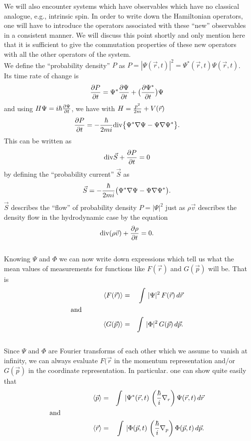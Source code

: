  We will also encounter systems which have observables which have no classical analogue, e.g., intrinsic spin. In order to write down
 the Hamiltonian operators, one will have to introduce the operators associated with these ``new'' observables in a consistent manner. We will discuss
 this point shortly and only mention here that it is sufficient to give the commutation properties of these new operators with all the other operators
 of the system.\\
 
 We define the ``probability density'' $P$ as $P = |\Psi(\vec{r},t)|^2 = \Psi^*(\vec{r},t) \Psi(\vec{r},t)$. Its time rate of change is 
 $${\partial P\over \partial t} = \Psi^*{\partial \Psi\over \partial t} + \big( {\partial \Psi^*\over \partial t} \big)\Psi$$and using 
 $H\Psi = i\hbar {\partial \Psi\over \partial t}$,  we have with $H = {p^2\over 2m} + V(\vec{r})$
 $${\partial P\over \partial t} = -{\hbar\over2m i} \hbox{div}\big\{\Psi^*\nabla \Psi - \Psi \nabla\Psi^* \big\}.$$This can be written as
 $$\hbox{div}\vec{S} + {\partial P\over \partial t} = 0$$by defining the ``probability current'' $\vec{S}$ as
 $$\vec{S} = -{\hbar\over2m i} \big(\Psi^*\nabla \Psi - \Psi \nabla\Psi^* \big).$$$\vec{S}$ describes the ``flow'' of probability density $P=|\Psi|^2$ just as
 $\rho \vec{v}$ describes the density flow in the hydrodynamic case by the equation
 $$\hbox{div}(\rho\vec{v}) + {\partial \rho\over \partial t} = 0.$$\\
  Knowing $\Psi$ and $\Phi$ we can now write down expressions which tell us what the mean values of measurements for functions like
 $F(\vec{r})$ and $G(\vec{p})$ will be. That is 
 \begin{eqnarray*}
  \langle F(\vec{r})\rangle  &=& \int  \, |\Psi|^2\, F(\vec{r})\,d\vec{r} \\ 
  \hbox{and~~~~~~~~~~~~~~~~~~\hfill} &\null&\\
  \langle G(\vec{p})\rangle  &=& \int  \, |\Phi|^2\, G(\vec{p})\,d\vec{p}.
 \end{eqnarray*}\\
 
 Since $\Psi$ and $\Phi$ are Fourier transforms of each other which we assume to vanish at infinity, we can always evaluate $F(\vec{r}$ in the momentum representation and/or $G(\vec{p})$ in the coordinate representation. In particular. one can show quite easily that 
  \begin{eqnarray*}
  \langle \vec{p}\rangle  &=& \int  \, |\Psi^*(\vec{r},t)\, \left( {\hbar\over i} \nabla_r\right) \Psi(\vec{r},t)\,d\vec{r}\\
  \hbox{and~~~~~~~~~~~~~~~~~~\hfill} &\null&\\
  \langle \vec{r}\rangle  &=& \int  \, |\Phi(\vec{p},t)\, \left( {\hbar\over i} \nabla_p\right) \Phi(\vec{p},t)\,d\vec{p}. 
 \end{eqnarray*}\\

